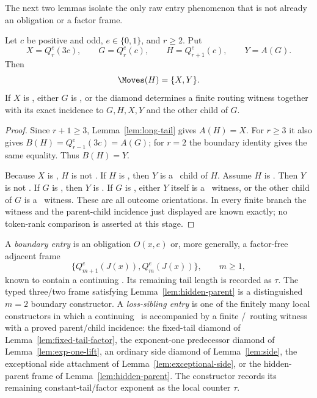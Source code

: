 The next two lemmas isolate the only raw entry phenomenon that is not already
an obligation or a factor frame.

\begin{lemma}\label{lem:fixed-tail-factor}
Let $c$ be positive and odd, $e\in\{0,1\}$, and $r\ge2$. Put
\[
  X=Q_r^e(3c),\qquad G=Q_r^e(c),\qquad H=Q_{r+1}^e(c),\qquad Y=A(G).
\]
Then
\[
  \Moves(H)=\{X,Y\}.
\]
If $X$ is \DRAW, either $G$ is \DRAW, or the diamond determines a finite
routing witness together with its exact incidence to $G,H,X,Y$ and the other
child of $G$.
\end{lemma}

\begin{proof}
Since $r+1\ge3$, Lemma~\ref{lem:long-tail} gives $A(H)=X$. For $r\ge3$ it
also gives $B(H)=Q_{r-1}^e(3c)=A(G)$; for $r=2$ the boundary identity gives
the same equality. Thus $B(H)=Y$.

Because $X$ is \DRAW, $H$ is not \LOSS. If $H$ is \WIN, then $Y$ is a
\LOSS\ child of $H$. Assume $H$ is \DRAW. Then $Y$ is not \LOSS. If $G$ is
\LOSS, then $Y$ is \WIN. If $G$ is \WIN, either $Y$ itself is a \LOSS\
witness, or the other child of $G$ is a \LOSS\ witness. These are all outcome
orientations. In every finite branch the witness and the parent-child
incidence just displayed are known exactly; no token-rank comparison is
asserted at this stage.
\end{proof}

\begin{definition}[Entry controls]\label{def:entry-controls}
A \emph{boundary entry} is an obligation $O(x,e)$ or, more generally, a
factor-free adjacent frame
\[
 \{Q_{m+1}^e(J(x)),Q_m^e(J(x))\},\qquad m\ge1,
\]
known to contain a continuing \DRAW. Its remaining tail length is recorded as
$\tau$. The typed three/two frame satisfying Lemma~\ref{lem:hidden-parent} is
a distinguished $m=2$ boundary constructor.
A \emph{loss-sibling entry} is one of the finitely many local constructors
in which a continuing \DRAW\ is accompanied by a finite \WIN/\LOSS\ routing
witness with a proved parent/child incidence: the fixed-tail diamond of Lemma~\ref{lem:fixed-tail-factor}, the exponent-one predecessor diamond of Lemma~\ref{lem:exp-one-lift}, an ordinary side diamond of Lemma~\ref{lem:side}, the exceptional side attachment of Lemma~\ref{lem:exceptional-side}, or the hidden-parent frame of Lemma~\ref{lem:hidden-parent}. The constructor records its remaining
constant-tail/factor exponent as the local counter $\tau$.
\end{definition}

